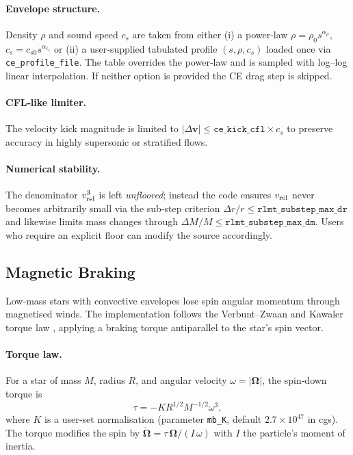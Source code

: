 \documentclass[11pt]{article}
\begin{document}
\paragraph{Envelope structure.}
Density $\rho$ and sound speed $c_s$ are taken from either
(i) a power‑law $\rho=\rho_0s^{\alpha_\rho}$, $c_s=c_{s0}s^{\alpha_{c_s}}$
or
(ii) a user‑supplied tabulated profile $(s,\rho,c_s)$ loaded once via
\texttt{ce\_profile\_file}.  The table overrides the power‑law and is sampled
with log–log linear interpolation.  If neither option is provided the CE drag
step is skipped.

\paragraph{CFL‑like limiter.}
The velocity kick magnitude is limited to
$|\Delta\mathbf v|\le\texttt{ce\_kick\_cfl}\times c_s$ to preserve accuracy
in highly supersonic or stratified flows.

\paragraph{Numerical stability.}
The denominator $v_{\rm rel}^3$ is left \emph{unfloored}; instead the code
ensures $v_{\rm rel}$ never becomes arbitrarily small via the
sub‑step criterion $\Delta r/r\le\texttt{rlmt\_substep\_max\_dr}$ and likewise
limits mass changes through $\Delta M/M\le\texttt{rlmt\_substep\_max\_dm}$.
Users who require an explicit floor can modify the source accordingly.

\subsection{Magnetic Braking}
\label{sec:mb}

Low‑mass stars with convective envelopes lose spin angular momentum through
magnetised winds.  The implementation follows the Verbunt–Zwaan and Kawaler
torque law \citep{Verbunt1981,Kawaler1988}, applying a braking torque
antiparallel to the star's spin vector.

\paragraph{Torque law.} For a star of mass $M$, radius $R$, and angular
velocity $\omega = |\bm\Omega|$, the spin‑down torque is
\begin{equation}
\tau = -K R^{1/2} M^{-1/2} \omega^3,
\label{eq:mb_torque}
\end{equation}
where $K$ is a user‑set normalisation (parameter \texttt{mb\_K}, default
$2.7\times10^{47}$ in cgs).  The torque modifies the spin by
$\dot{\bm\Omega}=\tau\,\bm\Omega/(I\,\omega)$ with $I$ the particle's moment
of inertia.
\end{document}
